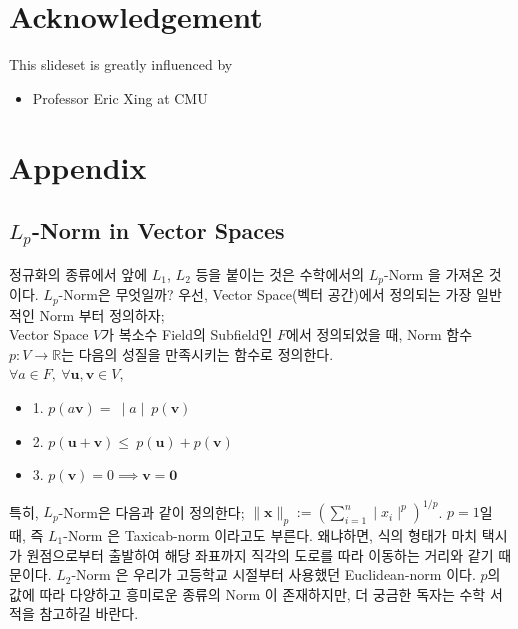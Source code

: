 \documentclass[a4paper]{oblivoir}
\begin{document}
\section*{Acknowledgement}
This slideset is greatly influenced by
\begin{itemize}
\item Professor Eric Xing at CMU
\end{itemize}

\section*{Appendix}
\subsection*{$L_{p}$-Norm in Vector Spaces}
정규화의 종류에서 앞에 $L_{1}$, $L_{2}$ 등을 붙이는 것은 수학에서의 $L_{p}$-Norm 을 가져온 것이다. $L_{p}$-Norm은 무엇일까? 우선, Vector Space(벡터 공간)에서 정의되는 가장 일반적인 Norm 부터 정의하자; \\
\indent Vector Space $V$가 복소수 Field의 Subfield인 $F$에서 정의되었을 때, Norm 함수 $p: V \to \mathds{R}$는 다음의 성질을 만족시키는 함수로 정의한다.\\ $\forall a \in F, \: \forall \textbf{u}, \textbf{v} \in V$, \begin{itemize}\itemsep0pt
\item[] 1. $p(a\textbf{v}) =\: \mid a \mid \: p(\textbf{v})$
\item[] 2. $p(\textbf{u} + \textbf{v}) \leq \: p(\textbf{u}) + p(\textbf{v})$
\item[] 3. $p(\textbf{v})=0 \implies \textbf{v}=\textbf{0}$
\end{itemize}

\indent 특히, $L_{p}$-Norm은 다음과 같이 정의한다; $\| \textbf{x} \|_{p} := \left( \sum_{i=1}^{n}\mid x_{i} \mid^{p} \right)^{1/p}$. $p=1$일 때, 즉 $L_{1}$-Norm 은 Taxicab-norm 이라고도 부른다. 왜냐하면, 식의 형태가 마치 택시가 원점으로부터 출발하여 해당 좌표까지 직각의 도로를 따라 이동하는 거리와 같기 때문이다. $L_{2}$-Norm 은 우리가 고등학교 시절부터 사용했던 Euclidean-norm 이다. $p$의 값에 따라 다양하고 흥미로운 종류의 Norm 이 존재하지만, 더 궁금한 독자는 수학 서적을 참고하길 바란다.
\end{document}
